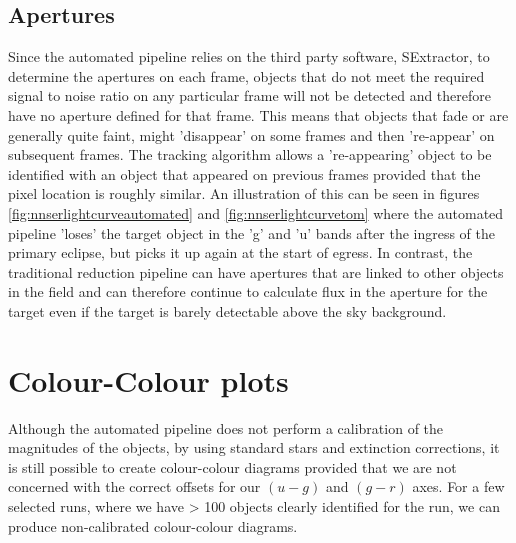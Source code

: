 \subsection{Apertures}
Since the automated pipeline relies on the third party software, SExtractor, to determine the apertures on each frame, objects that do not meet the required signal to noise ratio on any particular frame will not be detected and therefore have no aperture defined for that frame. This means that objects that fade or are generally quite faint, might 'disappear' on some frames and then 're-appear' on subsequent frames. The tracking algorithm allows a 're-appearing' object to be identified with an object that appeared on previous frames provided that the pixel location is roughly similar. An illustration of this can be seen in figures \ref{fig:nnserlightcurveautomated} and \ref{fig:nnserlightcurvetom} where the automated pipeline 'loses' the target object in the 'g' and 'u' bands after the ingress of the primary eclipse, but picks it up again at the start of egress. In contrast, the traditional reduction pipeline can have apertures that are linked to other objects in the field and can therefore continue to calculate flux in the aperture for the target even if the target is barely detectable above the sky background.

\section{Colour-Colour plots}
Although the automated pipeline does not perform a calibration of the magnitudes of the objects, by using standard stars and extinction corrections, it is still possible to create colour-colour diagrams provided that we are not concerned with the correct offsets for our $(u-g)$ and $(g-r)$ axes. For a few selected runs, where we have > 100 objects clearly identified for the run, we can produce non-calibrated colour-colour diagrams. 


